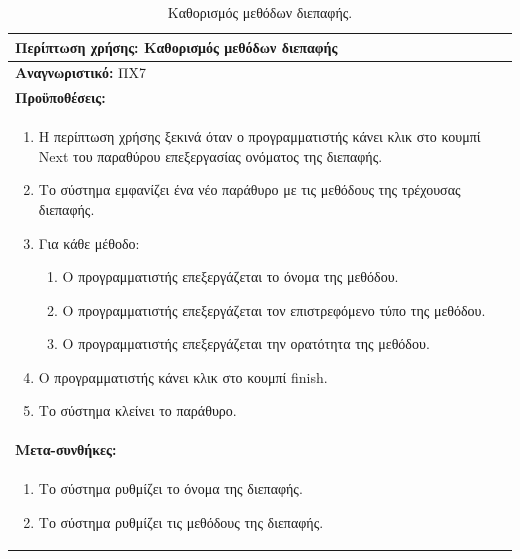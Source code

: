\begin{table}[H]
	\hspace*{-0.2cm}
    \centering
    \scriptsize
	\begin{tabular}{|p{10cm}|}
	\hline
		\textbf{Περίπτωση χρήσης:} Καθορισμός μεθόδων διεπαφής \\
	\hline
		\textbf{Αναγνωριστικό:} ΠΧ7 \\
	\hline	
		\textbf{Προϋποθέσεις:} \\
		\begin{enumerate}
			\item Η περίπτωση χρήσης ξεκινά όταν ο προγραμματιστής κάνει κλικ στο κουμπί Next του παραθύρου επεξεργασίας ονόματος της διεπαφής.
			\item Το σύστημα εμφανίζει ένα νέο παράθυρο με τις μεθόδους της τρέχουσας διεπαφής.
			\item Για κάθε μέθοδο:\begin{enumerate}
									 \item Ο προγραμματιστής επεξεργάζεται το όνομα της μεθόδου.
									\item Ο προγραμματιστής επεξεργάζεται τον επιστρεφόμενο τύπο της μεθόδου.
									  \item Ο προγραμματιστής επεξεργάζεται την ορατότητα της μεθόδου.
								   \end{enumerate}
			 \item Ο προγραμματιστής κάνει κλικ στο κουμπί finish.
			 \item Το σύστημα κλείνει το παράθυρο.
		   \end{enumerate} \\
	   \hline
		   \textbf{Μετα-συνθήκες:} \\
		   \begin{enumerate}
			   \item Το σύστημα ρυθμίζει το όνομα της διεπαφής.
			   \item Το σύστημα ρυθμίζει τις μεθόδους της διεπαφής.
		   \end{enumerate} \\
	\hline
    \end{tabular}
    \caption{Καθορισμός μεθόδων διεπαφής.}
    \label{tab:setInterfaceMethodsUC}
\end{table}

